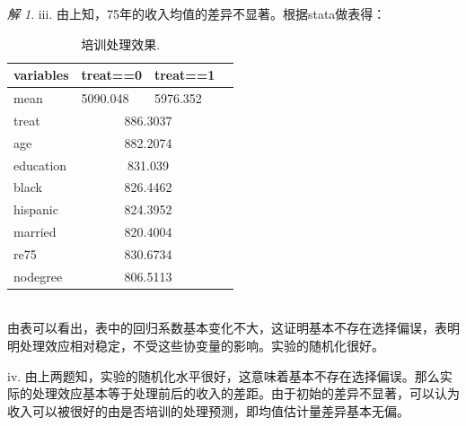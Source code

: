 \documentclass[a4paper]{ctexart}
\theoremstyle{remark}
\newtheorem*{solution}{解}
\begin{document}
\begin{itemize}
\begin{solution}
    iii. 由上知，75年的收入均值的差异不显著。根据stata做表得：\\
    \begin{table}[h]
        \centering
        \begin{tabular}{llll}%
            \hline
            variables & treat==0& treat==1 \\   
            \hline
            mean & 5090.048 & 5976.352 \\
            treat & \multicolumn{2}{c}{886.3037}\\
            age & \multicolumn{2}{c}{882.2074}\\
    
            education & \multicolumn{2}{c}{831.039} \\

            black & \multicolumn{2}{c}{826.4462}\\

            hispanic & \multicolumn{2}{c}{824.3952}  \\

            married & \multicolumn{2}{c}{820.4004} \\    

            re75 & \multicolumn{2}{c}{830.6734} \\   

            nodegree &\multicolumn{2}{c}{806.5113} \\
            \hline
        \end{tabular} 
        \caption{\label{font-table} 培训处理效果. }
    \end{table}\\
    由表可以看出，表中的回归系数基本变化不大，这证明基本不存在选择偏误，表明明处理效应相对稳定，不受这些协变量的影响。实验的随机化很好。
    


    iv. 由上两题知，实验的随机化水平很好，这意味着基本不存在选择偏误。那么实际的处理效应基本等于处理前后的收入的差距。由于初始的差异不显著，可以认为收入可以被很好的由是否培训的处理预测，即均值估计量差异基本无偏。
    \\
    

\end{solution}
\end{itemize}
\end{document}
